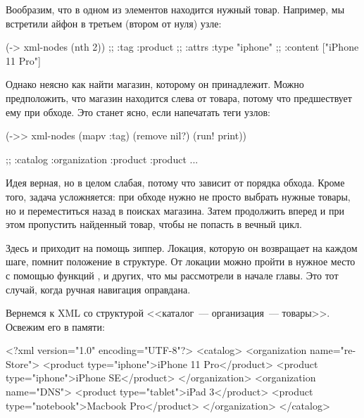 Вообразим, что в одном из элементов находится нужный товар. Например, мы
встретили айфон в третьем (втором от нуля) узле:

\begin{english}
  \begin{clojure}
(-> xml-nodes (nth 2))
;; {:tag :product
;;  :attrs {:type "iphone"}
;;  :content ["iPhone 11 Pro"]}
  \end{clojure}
\end{english}

Однако неясно как найти магазин, которому он принадлежит. Можно предположить,
что магазин находится слева от товара, потому что предшествует ему при
обходе. Это станет ясно, если напечатать теги узлов:

\begin{english}
  \begin{clojure}
(->> xml-nodes
     (mapv :tag)
     (remove nil?)
     (run! print))

;; :catalog :organization :product :product ...
  \end{clojure}
\end{english}

Идея верная, но в целом слабая, потому что зависит от порядка обхода. Кроме
того, задача усложняется: при обходе нужно не просто выбрать нужные товары, но и
переместиться назад в поисках магазина. Затем продолжить вперед и при этом
пропустить найденный товар, чтобы не попасть в вечный цикл.

Здесь и приходит на помощь зиппер. Локация, которую он возвращает на каждом
шаге, помнит положение в структуре. От локации можно пройти в нужное место с
помощью функций ,  и других, что мы рассмотрели в
начале главы. Это тот случай, когда ручная навигация оправдана.


Вернемся к XML со структурой <<каталог~--- организация~--- товары>>. Освежим его в
памяти:

\begin{english}
  \begin{xml}
<?xml version="1.0" encoding="UTF-8"?>
<catalog>
  <organization name="re-Store">
    <product type="iphone">iPhone 11 Pro</product>
    <product type="iphone">iPhone SE</product>
  </organization>
  <organization name="DNS">
    <product type="tablet">iPad 3</product>
    <product type="notebook">Macbook Pro</product>
  </organization>
</catalog>
  \end{xml}
\end{english}

